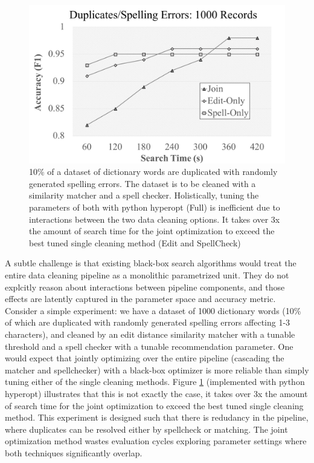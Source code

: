 \begin{figure}[t]
\centering
 \includegraphics[width=0.9\columnwidth]{figures/teaser-experiment.png}
 \caption{\small 10\% of a dataset of dictionary words are duplicated with randomly generated spelling errors. The dataset is to be cleaned with a similarity matcher and a spell checker. Holistically, tuning the parameters of both with \textsf{python hyperopt} (Full) is inefficient due to interactions between the two data cleaning options. It takes over 3x the amount of search time for the joint optimization to exceed the best tuned single cleaning method (Edit and SpellCheck) \label{fig:teaser}}
\end{figure}

A subtle challenge is that existing black-box search algorithms would treat the entire data cleaning pipeline as a monolithic parametrized unit.
They do not explcitly reason about interactions between pipeline components, and those effects are latently captured in the parameter space and accuracy metric.
Consider a simple experiment: we have a dataset of 1000 dictionary words (10\% of which are duplicated with randomly generated spelling errors affecting 1-3 characters), and cleaned by an edit distance similarity matcher with a tunable threshold and a spell checker with a tunable recommendation parameter.
 One would expect that jointly optimizing over the entire pipeline (cascading the matcher and spellchecker) with a black-box optimizer is more reliable than simply tuning either of the single cleaning methods. 
Figure \ref{fig:teaser} (implemented with \textsf{python hyperopt}) illustrates that this is not exactly the case, it takes over 3x the amount of search time for the joint optimization to exceed the best tuned single cleaning method.
This experiment is designed such that there is redudancy in the pipeline, where duplicates can be resolved either by spellcheck or matching.
The joint optimization method wastes evaluation cycles exploring parameter settings where both techniques significantly overlap.


